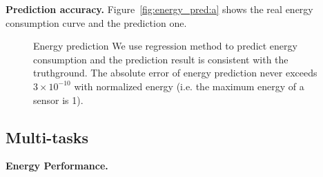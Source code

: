 \textbf{Prediction accuracy.}
Figure~\ref{fig:energy_pred:a} shows the real energy consumption curve and the
prediction one.

\begin{figure}[htbp]
	\centering
	\hspace{0.1cm}
	\vspace{-0.1in}
	\caption{Energy prediction
		\textnormal{
			We use regression method to predict energy consumption and the
			prediction result is consistent with the truthground.  The absolute
			error of energy prediction never exceeds $3\times10^{-10}$ with normalized energy
			(i.e. the maximum energy of a sensor is 1).
		}
	}
	\label{fig:energy_pred}
\end{figure}

\subsection{Multi-tasks}
\textbf{Energy Performance.}

